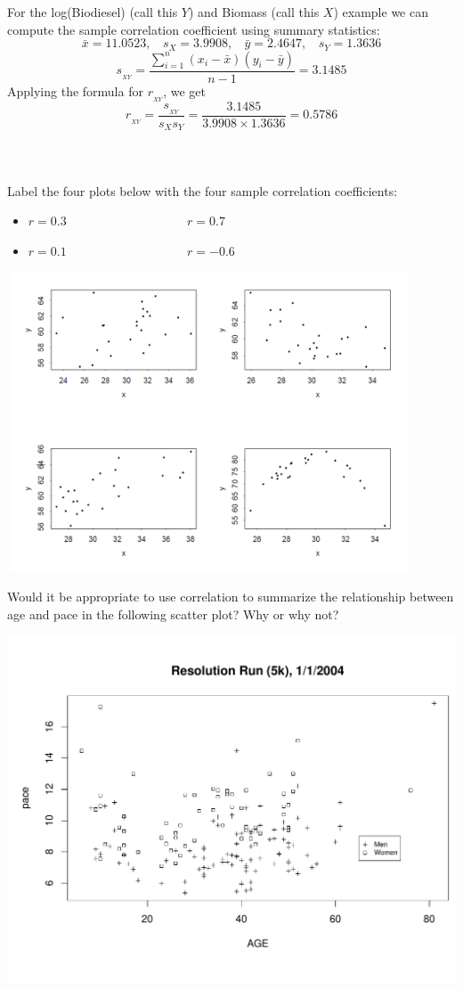 For the log(Biodiesel) (call this $Y$) and Biomass (call this $X$) example we can compute the sample correlation coefficient using summary statistics: \label{bio}
$$ \bar{x}=11.0523, ~~~~ s_X=3.9908, ~~~~\bar{y}=2.4647, ~~~~ s_Y = 1.3636$$ 
$$ s_{_{XY}}=\frac{\sum_{i=1}^{n}(x_i-\bar{x})(y_i-\bar{y})}{n-1} = 3.1485$$
Applying the formula for $r_{_{XY}}$, we get
$$ r_{_{XY}}=\frac{s_{_{XY}}}{s_X s_Y}=\frac{3.1485}{3.9908 \times 1.3636} =0.5786$$~\\~\\~\\

Label the four plots below with the four sample correlation coefficients:
\begin{itemize}
\item $r=0.3$ ~~~~~~~~~~~~~~~~~~ $r=0.7$ 
\item $r=0.1$ ~~~~~~~~~~~~~~~~~~ $r=-0.6$ 
\end{itemize}
\begin{center}
\includegraphics[height=3.5in,width=4.75in]{scattermatch}
\end{center}

\newpage

Would it be appropriate to use correlation to summarize the relationship between age and pace in the following scatter plot?  Why or why not?
\begin{flushleft}
\includegraphics[scale=0.3]{res5k_nomodel.pdf}
\end{flushleft}


